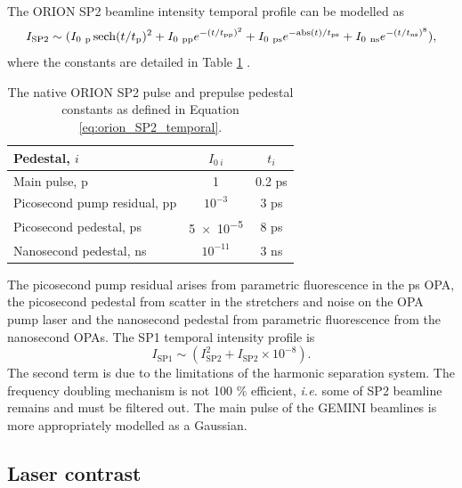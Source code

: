 The ORION SP2 beamline intensity temporal profile can be modelled as
\begin{equation}\label{eq:orion_SP2_temporal}
	I_\mathrm{SP2} \sim (I_{0 \ \mathrm{p}}\sech(t/t_\mathrm{p})^2 + I_{0 \ \mathrm{pp}}e^{-(t/t_\mathrm{pp})^2} + I_{0 \ \mathrm{ps}}e^{-\mathrm{abs}(t)/t_\mathrm{ps}} + I_{0 \ \mathrm{ns}}e^{-(t/t_\mathrm{ns})^8}),
\end{equation}
where the constants are detailed in Table \ref{tab:orion_pedestals} \cite{dhillierModelORIONContrast2022}.
\begin{table}[]
	\centering
	\begin{tabular}{lcc}
		\hline\hline
		Pedestal, $i$                & $I_{0 \ i}$ & $t_i$  \\ \hline
		Main pulse, p                & 1           & 0.2 ps \\
		Picosecond pump residual, pp & $10^{-3}$   & 3 ps   \\
		Picosecond pedestal, ps      & \num{5e-5}  & 8 ps   \\
		Nanosecond pedestal, ns      & $10^{-11}$  & 3 ns  \\ \hline \hline
	\end{tabular}
	\caption{The native ORION SP2 pulse and prepulse pedestal constants as defined in Equation \ref{eq:orion_SP2_temporal}.}
	\label{tab:orion_pedestals}
\end{table}
The picosecond pump residual arises from parametric fluorescence in the ps OPA, the picosecond pedestal from scatter in the stretchers and noise on the OPA pump laser and the nanosecond pedestal from parametric fluorescence from the nanosecond OPAs. 
The SP1 temporal intensity profile is
\begin{equation}
	I_\mathrm{SP1} \sim (I_\mathrm{SP2}^2 + I_\mathrm{SP2} \times 10^{-8}).
\end{equation}
The second term is due to the limitations of the harmonic separation system. The frequency doubling mechanism is not 100 \% efficient, \textit{i.e.} some of SP2 beamline remains and must be filtered out. The main pulse of the GEMINI beamlines is more appropriately modelled as a Gaussian.

\subsection{Laser contrast}


